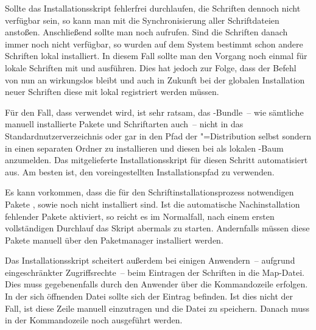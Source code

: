 Sollte das Installationsskript fehlerfrei durchlaufen, die Schriften dennoch 
nicht verfügbar sein, so kann man mit  
die Synchronisierung aller Schriftdateien anstoßen. Anschließend sollte man 
noch  aufrufen. Sind die Schriften danach immer noch 
nicht verfügbar, so wurden auf dem System bestimmt schon andere Schriften lokal 
installiert. In diesem Fall sollte man den Vorgang noch einmal für lokale 
Schriften mit  und  
ausführen. Dies hat jedoch zur Folge, dass der Befehl  von nun 
an wirkungslos bleibt und auch in Zukunft bei der globalen Installation neuer 
Schriften diese mit  lokal registriert werden müssen.

Für den Fall, dass  verwendet wird, ist sehr 
ratsam, das \TUDScript-Bundle~-- wie sämtliche manuell installierte Pakete und 
Schriftarten auch~-- nicht in das Standardnutzerverzeichnis oder gar in den
Pfad der "=Distribution selbst sondern in einen 
separaten Ordner zu installieren und diesen bei  
als lokalen -Baum anzumelden. Das mitgelieferte Installationsskript 
für diesen Schritt automatisiert aus. Am besten ist, den voreingestellten 
Installationspfad zu verwenden.

Es kann vorkommen, dass die für den Schriftinstallationsprozess notwendigen 
Pakete ,  sowie  noch nicht 
installiert sind. Ist die automatische Nachinstallation fehlender Pakete 
aktiviert, so reicht es im Normalfall, nach einem ersten vollständigen 
Durchlauf das Skript abermals zu starten. Andernfalls müssen diese Pakete 
manuell über den Paketmanager installiert werden.

Das Installationsskript scheitert außerdem bei einigen Anwendern~-- aufgrund 
eingeschränkter Zugriffsrechte~-- beim Eintragen der Schriften in die Map-Datei.
Dies muss gegebenenfalls durch den Anwender über die Kommandozeile 
 erfolgen. In der sich öffnenden 
Datei sollte sich der Eintrag  befinden. Ist dies nicht 
der Fall, ist diese Zeile manuell einzutragen und die Datei zu speichern. 
Danach muss in der Kommandozeile noch  ausgeführt 
werden.



